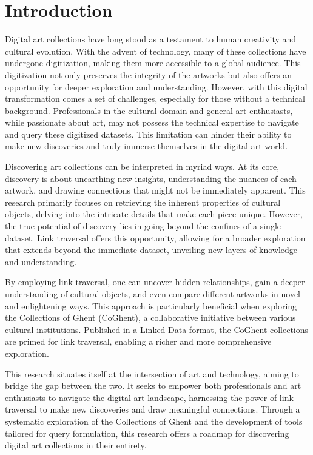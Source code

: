 \chapter*{Introduction}
\label{chap:intro}

Digital art collections have long stood as a testament to human creativity and cultural evolution. With the advent of technology, many of these collections have undergone digitization, making them more accessible to a global audience. This digitization not only preserves the integrity of the artworks but also offers an opportunity for deeper exploration and understanding. However, with this digital transformation comes a set of challenges, especially for those without a technical background. Professionals in the cultural domain and general art enthusiasts, while passionate about art, may not possess the technical expertise to navigate and query these digitized datasets. This limitation can hinder their ability to make new discoveries and truly immerse themselves in the digital art world.

Discovering art collections can be interpreted in myriad ways. At its core, discovery is about unearthing new insights, understanding the nuances of each artwork, and drawing connections that might not be immediately apparent. This research primarily focuses on retrieving the inherent properties of cultural objects, delving into the intricate details that make each piece unique. However, the true potential of discovery lies in going beyond the confines of a single dataset. Link traversal offers this opportunity, allowing for a broader exploration that extends beyond the immediate dataset, unveiling new layers of knowledge and understanding.

By employing link traversal, one can uncover hidden relationships, gain a deeper understanding of cultural objects, and even compare different artworks in novel and enlightening ways. This approach is particularly beneficial when exploring the Collections of Ghent (CoGhent), a collaborative initiative between various cultural institutions. Published in a Linked Data format, the CoGhent collections are primed for link traversal, enabling a richer and more comprehensive exploration.

This research situates itself at the intersection of art and technology, aiming to bridge the gap between the two. It seeks to empower both professionals and art enthusiasts to navigate the digital art landscape, harnessing the power of link traversal to make new discoveries and draw meaningful connections. Through a systematic exploration of the Collections of Ghent and the development of tools tailored for query formulation, this research offers a roadmap for discovering digital art collections in their entirety.

